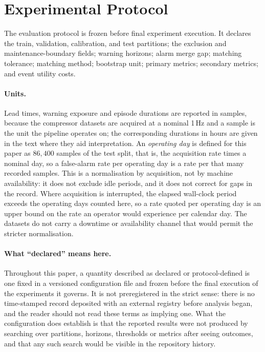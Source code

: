 \section{Experimental Protocol}
\label{sec:protocol}

The evaluation protocol is frozen before final experiment execution. It declares the train, validation, calibration, and test partitions; the exclusion and maintenance-boundary fields; warning horizons; alarm merge gap; matching tolerance; matching method; bootstrap unit; primary metrics; secondary metrics; and event utility costs.

\paragraph{Units.} Lead times, warning exposure and episode durations are reported in samples, because the compressor datasets are acquired at a nominal 1\,Hz and a sample is the unit the pipeline operates on; the corresponding durations in hours are given in the text where they aid interpretation. An \emph{operating day} is defined for this paper as \(86{,}400\) samples of the test split, that is, the acquisition rate times a nominal day, so a false-alarm rate per operating day is a rate per that many recorded samples. This is a normalisation by acquisition, not by machine availability: it does not exclude idle periods, and it does not correct for gaps in the record. Where acquisition is interrupted, the elapsed wall-clock period exceeds the operating days counted here, so a rate quoted per operating day is an upper bound on the rate an operator would experience per calendar day. The datasets do not carry a downtime or availability channel that would permit the stricter normalisation.

\paragraph{What ``declared'' means here.} Throughout this paper, a quantity described as declared or protocol-defined is one fixed in a versioned configuration file and frozen before the final execution of the experiments it governs. It is not preregistered in the strict sense: there is no time-stamped record deposited with an external registry before analysis began, and the reader should not read these terms as implying one. What the configuration does establish is that the reported results were not produced by searching over partitions, horizons, thresholds or metrics after seeing outcomes, and that any such search would be visible in the repository history.

